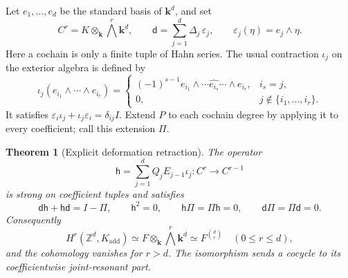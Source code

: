 \documentclass[11pt,oneside]{article}
\numberwithin{equation}{section}
\newtheorem{theorem}{Theorem}[section]
\theoremstyle{definition}
\theoremstyle{remark}
\newcommand{\Z}{\mathbb Z}
\newcommand{\kk}{\mathbf k}
\newcommand{\dd}{\mathsf d}
\newcommand{\hh}{\mathsf h}
\newcommand{\eps}{\varepsilon}
\begin{document}
Let $e_1,\ldots,e_d$ be the standard basis of $\kk^d$, and set
\[
 C^r=K\otimes_\kk\bigwedge^r\kk^d,
 \qquad
 \dd=\sum_{j=1}^d\Delta_j\,\eps_j,
 \qquad \eps_j(\eta)=e_j\wedge\eta.
\]
Here a cochain is only a finite tuple of Hahn series. The usual contraction
$\iota_j$ on the exterior algebra is defined by
\[
 \iota_j(e_{i_1}\wedge\cdots\wedge e_{i_r})
 =\begin{cases}
 (-1)^{s-1}e_{i_1}\wedge\cdots\widehat{e_{i_s}}\cdots\wedge e_{i_r},
        &i_s=j,\\
 0,&j\notin\{i_1,\ldots,i_r\}.
 \end{cases}
\]
It satisfies
$\eps_i\iota_j+\iota_j\eps_i=\delta_{ij}I$.
Extend $P$ to each cochain degree by applying it to every coefficient;
call this extension $\Pi$.

\begin{theorem}[Explicit deformation retraction]\label{dsup:thm:koszul}
The operator
\begin{equation}\label{dsup:eq:homotopy}
 \hh=\sum_{j=1}^d Q_jE_{j-1}\iota_j:C^r\longrightarrow C^{r-1}
\end{equation}
is strong on coefficient tuples and satisfies
\begin{equation}\label{dsup:eq:homotopyidentity}
 \dd\hh+\hh\dd=I-\Pi,\qquad
 \hh^2=0,\qquad \hh\Pi=\Pi\hh=0,\qquad
 \dd\Pi=\Pi\dd=0.
\end{equation}
Consequently
\begin{equation}\label{dsup:eq:cohomology}
 H^r(\Z^d,K_{\mathrm{add}})
 \simeq F\otimes_\kk\bigwedge^r\kk^d
 \simeq F^{\binom dr}
 \quad(0\le r\le d),
\end{equation}
and the cohomology vanishes for $r>d$. The isomorphism sends a cocycle to
its coefficientwise joint-resonant part.
\end{theorem}
\end{document}
